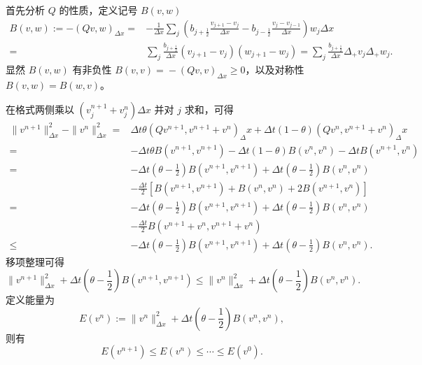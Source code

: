 \begin{solution*}
    首先分析 $Q$ 的性质，定义记号 $B(v,w)$
    \begin{align*}
        B(v,w):= - (Q v,w)_{\Delta x}
        ={} & - \frac{1}{\Delta x} \sum_j \left(b_{j+\frac12}\frac{v_{j+1}-v_{j}}{\Delta x}-b_{j-\frac12}\frac{v_j - v_{j-1}}{\Delta x}\right)w_j \Delta x \\
        ={} & \sum_j \frac{b_{j+\frac12}}{\Delta x}(v_{j+1}-v_{j})(w_{j+1}-w_{j})
        ={}  \sum_j \frac{b_{j+\frac12}}{\Delta x} \Delta_+ v_{j} \Delta_+ w_{j}.
    \end{align*}
    显然 $B(v,w)$ 有非负性 $B(v,v) ={} - (Q v,v)_{\Delta x} \ge 0$，以及对称性 $B(v,w) = B(w,v)$。

    在格式两侧乘以 $(v_j^{n+1} + v_j^n)\Delta x$ 并对 $j$ 求和，可得
    \begin{align*}
        \|v^{n+1}\|_{\Delta x}^2 - \|v^{n}\|_{\Delta x}^2
        ={}   &
        \Delta t \theta (Q v^{n+1}, v^{n+1} + v^n)_\Delta x
        + \Delta t (1-\theta) (Q v^{n}, v^{n+1} + v^n)_\Delta x
        \\
        ={}   &
        - \Delta t \theta B(v^{n+1}, v^{n+1}) - \Delta t (1-\theta) B(v^{n}, v^n)
        - \Delta t B(v^{n+1},v^n)
        \\
        ={}   &
        - \Delta t \left(\theta-\frac12\right) B(v^{n+1}, v^{n+1}) + \Delta t \left(\theta-\frac12\right) B(v^{n}, v^n)
        \\
              & - \frac{\Delta t}2 \left[
        B(v^{n+1},v^{n+1}) + B(v^{n},v^n) + 2 B(v^{n+1},v^n)
        \right]                                                                                                                 \\
        ={}   &
        - \Delta t \left(\theta-\frac12\right) B(v^{n+1}, v^{n+1}) + \Delta t \left(\theta-\frac12\right) B(v^{n}, v^n)
        \\
              & -\frac{\Delta t}2 B(v^{n+1}+ v^n,v^{n+1} + v^n)
        \\
        \le{} & - \Delta t \left(\theta-\frac12\right) B(v^{n+1}, v^{n+1}) + \Delta t \left(\theta-\frac12\right) B(v^{n}, v^n).
    \end{align*}
    移项整理可得
    \[
        \|v^{n+1}\|_{\Delta x}^2 + \Delta t \left(\theta-\frac12\right) B(v^{n+1}, v^{n+1})
        \le{} \|v^{n}\|_{\Delta x}^2 + \Delta t \left(\theta-\frac12\right) B(v^{n}, v^n).
    \]
    定义能量为
    \[
        E(v^n) := \|v^{n}\|_{\Delta x}^2 + \Delta t \left(\theta-\frac12\right) B(v^{n}, v^n),
    \]
    则有
    \[
        E(v^{n+1}) \le E(v^n) \le \cdots \le E(v^0).
    \]


\end{solution*}
